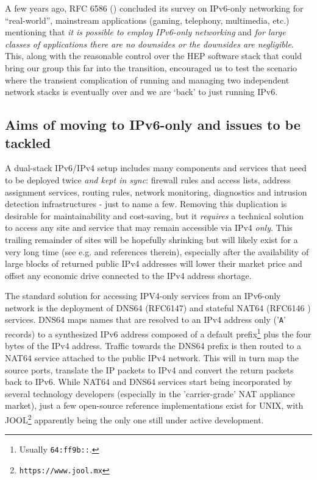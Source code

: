 
A few years ago, RFC 6586 (\cite{rfc}) concluded its survey on IPv6-only
networking for ``real-world'', mainstream applications (gaming, telephony,
multimedia, etc.) mentioning that {\it \guillemotleft it is possible to employ IPv6-only
networking\guillemotright} and {\it \guillemotleft for large classes of applications
there are no downsides or the downsides are negligible\guillemotright}.
This, along with the reasonable control over the HEP software stack that
could bring our group this far into the transition, encouraged us to test the 
scenario where the transient complication of running and managing
two independent network stacks is eventually over and we are `back' to just
running IPv6.

\subsection{Aims of moving to IPv6-only and issues to be tackled}

A dual-stack IPv6/IPv4 setup includes many components and services that need
to be deployed twice {\it and kept in sync}: firewall rules and access
lists, address assignment services, routing rules, network monitoring,
diagnostics and
intrusion detection infrastructures - just to name a few.
Removing this duplication is desirable for maintainability and cost-saving,
but it {\it requires} a technical
solution to access any site and service that may remain accessible via IPv4
{\it only}.
This trailing remainder of sites will be hopefully
shrinking but will likely exist for a very long time (see
e.g. \cite{ipv6trans} and references therein),
especially after the availability of large blocks of returned public IPv4
addresses will lower their market price and offset any economic drive
connected to the IPv4 address shortage.\par

The standard solution for accessing IPV4-only services from an IPv6-only
network is the deployment of DNS64 (RFC6147) and stateful
NAT64 (RFC6146 \cite{rfc}) services. DNS64 maps names that are resolved to
an IPv4 address only ('{\tt A}' records) to a synthesized IPv6 address composed
of a default prefix\footnote{Usually {\tt 64:ff9b::}.} plus the four bytes of
the IPv4 address. Traffic towards the DNS64 prefix is then routed to
a NAT64 service attached to the public IPv4 network. This will in turn map the
source ports, translate the IP packets to IPv4 and convert the return packets
back to IPv6. While NAT64 and DNS64 services start being incorporated by
several technology developers (especially in the 'carrier-grade' NAT 
appliance market),
just a few open-source reference implementations exist for UNIX, with
JOOL\footnote{\tt https://www.jool.mx} apparently being the only one still
under active development.\par

